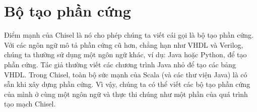 \documentclass[%
    10pt,
    headinclude, footexclude,
    openright, %
    notitlepage,
    cleardoubleempty,
    headsepline,
    pointlessnumbers,
    bibtotoc, idxtotoc,
    ]{scrbook}
\newcommand{\todo}[1]{{\emph{TODO: #1}}}
\newcommand{\myref}[2]{\href{#1}{#2}}
\renewcommand{\myref}[2]{{#2}{\footnote{\url{#1}}}}
\renewcommand{\todo}[1]{}
\begin{document}
\todo{Read and cite AXI, and check if the above is true}

\todo{Reconsider writing the testing chapter}

%
%
%
%
%
%
%
%
%


\chapter{Bộ tạo phần cứng}

Điểm mạnh của Chisel là nó cho phép chúng ta viết cái gọi là bộ tạo phần cứng. Với các ngôn ngữ mô tả phần cứng cũ hơn, chẳng hạn như VHDL và Verilog, chúng ta thường sử dụng một ngôn ngữ khác, ví dụ: Java hoặc Python, để tạo phần cứng. Tác giả thường viết các chương trình Java nhỏ để tạo các bảng VHDL. Trong Chisel, toàn bộ sức mạnh của Scala (và các thư viện Java) là có sẵn khi xây dựng phần cứng. Vì vậy, chúng ta có thể viết các bộ tạo phần cứng của mình ở cùng một ngôn ngữ và thực thi chúng như một phần của quá trình tạo mạch Chisel. 
\end{document}
